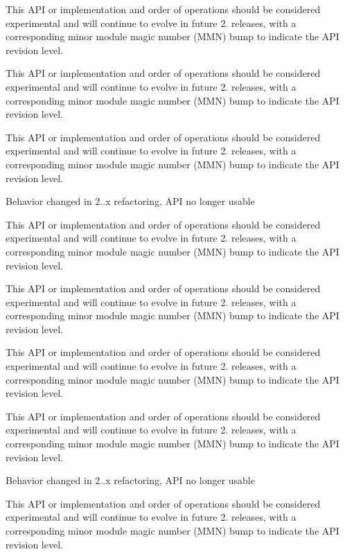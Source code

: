 \begin{DoxyRefList}
This A\+PI or implementation and order of operations should be considered experimental and will continue to evolve in future 2. releases, with a corresponding minor module magic number (M\+MN) bump to indicate the A\+PI revision level. 

This A\+PI or implementation and order of operations should be considered experimental and will continue to evolve in future 2. releases, with a corresponding minor module magic number (M\+MN) bump to indicate the A\+PI revision level. 

This A\+PI or implementation and order of operations should be considered experimental and will continue to evolve in future 2. releases, with a corresponding minor module magic number (M\+MN) bump to indicate the A\+PI revision level. 

Behavior changed in 2..\+x refactoring, A\+PI no longer usable  
\item[\label{bug__bug000003}%
\hypertarget{bug__bug000003}{}%
Global \hyperlink{group__APACHE__CORE__MUTEX_ga354bb6f9a53786fa1259e061ced592e2}{A\+P\+\_\+\+D\+E\+C\+L\+A\+RE} (apr\+\_\+status\+\_\+t) ap\+\_\+parse\+\_\+mutex(const char $\ast$arg]This A\+PI or implementation and order of operations should be considered experimental and will continue to evolve in future 2. releases, with a corresponding minor module magic number (M\+MN) bump to indicate the A\+PI revision level. 

This A\+PI or implementation and order of operations should be considered experimental and will continue to evolve in future 2. releases, with a corresponding minor module magic number (M\+MN) bump to indicate the A\+PI revision level. 

This A\+PI or implementation and order of operations should be considered experimental and will continue to evolve in future 2. releases, with a corresponding minor module magic number (M\+MN) bump to indicate the A\+PI revision level. 

This A\+PI or implementation and order of operations should be considered experimental and will continue to evolve in future 2. releases, with a corresponding minor module magic number (M\+MN) bump to indicate the A\+PI revision level. 

Behavior changed in 2..\+x refactoring, A\+PI no longer usable  
\item[\label{bug__bug000005}%
\hypertarget{bug__bug000005}{}%
Global \hyperlink{group__get__remote__host_gaa0b6d3ee3cfd9a8e8cb57936e467abfd}{A\+P\+\_\+\+D\+E\+C\+L\+A\+RE} (const char $\ast$) ap\+\_\+expr\+\_\+str\+\_\+exec(\hyperlink{structrequest__rec}{request\+\_\+rec} $\ast$r]This A\+PI or implementation and order of operations should be considered experimental and will continue to evolve in future 2. releases, with a corresponding minor module magic number (M\+MN) bump to indicate the A\+PI revision level. 


\end{DoxyRefList}
